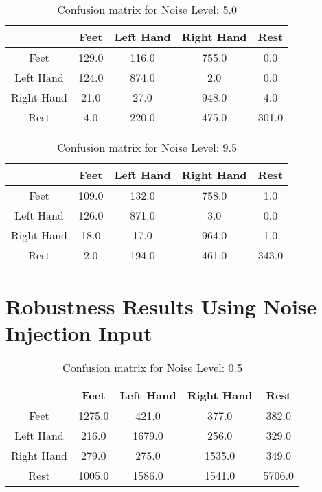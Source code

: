 \begin{table}[!htbp]
    \centering
    \begin{tabular}{|c||c|c|c|c|}
        \hline
		 & Feet & Left Hand & Right Hand & Rest \\
        \hline
        \hline
        Feet & 129.0 & 116.0 & 755.0 & 0.0 \\
        \hline
        Left Hand & 124.0 & 874.0 & 2.0 & 0.0 \\
        \hline
        Right Hand & 21.0 & 27.0 & 948.0 & 4.0 \\
        \hline
        Rest & 4.0 & 220.0 & 475.0 & 301.0 \\
        \hline
    \end{tabular}
    \caption{Confusion matrix for Noise Level: 5.0}
\end{table}

\begin{table}[!htbp]
    \centering
    \begin{tabular}{|c||c|c|c|c|}
        \hline
		 & Feet & Left Hand & Right Hand & Rest \\
        \hline
        \hline
        Feet & 109.0 & 132.0 & 758.0 & 1.0 \\
        \hline
        Left Hand & 126.0 & 871.0 & 3.0 & 0.0 \\
        \hline
        Right Hand & 18.0 & 17.0 & 964.0 & 1.0 \\
        \hline
        Rest & 2.0 & 194.0 & 461.0 & 343.0 \\
        \hline
    \end{tabular}
    \caption{Confusion matrix for Noise Level: 9.5}
\end{table}

\section{Robustness Results Using Noise Injection Input}\label{app:injection_robustness}
\begin{table}[!htbp]
    \centering
    \begin{tabular}{|c||c|c|c|c|}
        \hline
		 & Feet & Left Hand & Right Hand & Rest \\
        \hline
        \hline
        Feet & 1275.0 & 421.0 & 377.0 & 382.0 \\
        \hline
        Left Hand & 216.0 & 1679.0 & 256.0 & 329.0 \\
        \hline
        Right Hand & 279.0 & 275.0 & 1535.0 & 349.0 \\
        \hline
        Rest & 1005.0 & 1586.0 & 1541.0 & 5706.0 \\
        \hline
    \end{tabular}
    \caption{Confusion matrix for Noise Level: 0.5}
\end{table}

